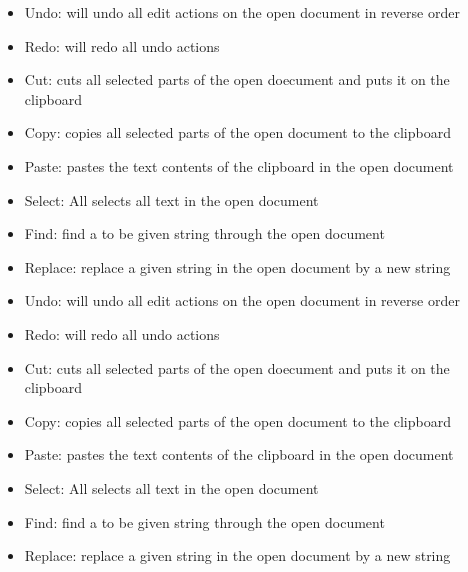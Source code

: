     \begin{itemize}
        \item Undo: will undo all edit actions on the open document in reverse order
        \item Redo: will redo all undo actions
        \item Cut: cuts all selected parts of the open doecument and puts it on the clipboard
        \item Copy: copies all selected parts of the open document to the clipboard
        \item Paste: pastes the text contents of the clipboard in the open document
        \item Select: All selects all text in the open document
        \item Find: find a to be given string through the open document
        \item Replace: replace a given string in the open document by a new string
    \end{itemize}

    \begin{itemize}
        \item Undo: will undo all edit actions on the open document in reverse order
        \item Redo: will redo all undo actions
        \item Cut: cuts all selected parts of the open doecument and puts it on the clipboard
        \item Copy: copies all selected parts of the open document to the clipboard
        \item Paste: pastes the text contents of the clipboard in the open document
        \item Select: All selects all text in the open document
        \item Find: find a to be given string through the open document
        \item Replace: replace a given string in the open document by a new string
    \end{itemize}

